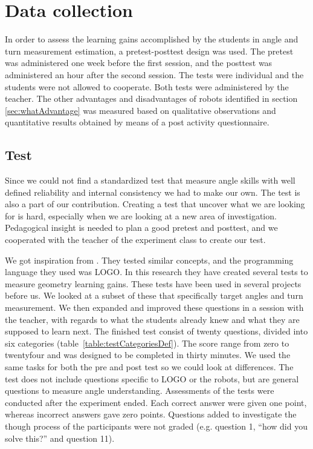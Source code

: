 \section{Data collection}
In order to assess the learning gains accomplished by the students in angle and turn measurement estimation, a pretest-posttest design was used. The pretest was administered one week before the first session, and the posttest was administered an hour after the second session. The tests were individual and the students were not allowed to cooperate. Both tests were administered by the teacher. The other advantages and disadvantages of robots identified in section \ref{sec:whatAdvantage} was measured based on qualitative observations and quantitative results obtained by means of a post activity questionnaire.

\subsection*{Test}
Since we could not find a standardized test that measure angle skills with well defined reliability and internal consistency we had to make our own. The test is also a part of our contribution. Creating a test that uncover what we are looking for is hard, especially when we are looking at a new area of investigation. Pedagogical insight is needed to plan a good pretest and posttest, and we cooperated with the teacher of the experiment class to create our test.

\bigskip\noindent
We got inspiration from \citeauthor{clements2001logo}\cite{clements2001logo}. They tested similar concepts, and the programming language they used was LOGO. In this research they have created several tests to measure geometry learning gains. These tests have been used in several projects before us. We looked at a subset of these that specifically target angles and turn measurement. We then expanded and improved these questions in a session with the teacher, with regards to what the students already knew and what they are supposed to learn next. 
The finished test consist of twenty questions, divided into six categories (table~\ref{table:testCategoriesDef}). The score range from zero to twentyfour and was designed to be completed in thirty minutes. We used the same tasks for both the pre and post test so we could look at differences. The test does not include questions specific to LOGO or the robots, but are general questions to measure angle understanding. 
Assessments of the tests were conducted after the experiment ended. Each correct answer were given one point, whereas incorrect answers gave zero points. Questions added to investigate the though process of the participants were not graded (e.g. question 1, "`how did you solve this?"' and question 11). 

